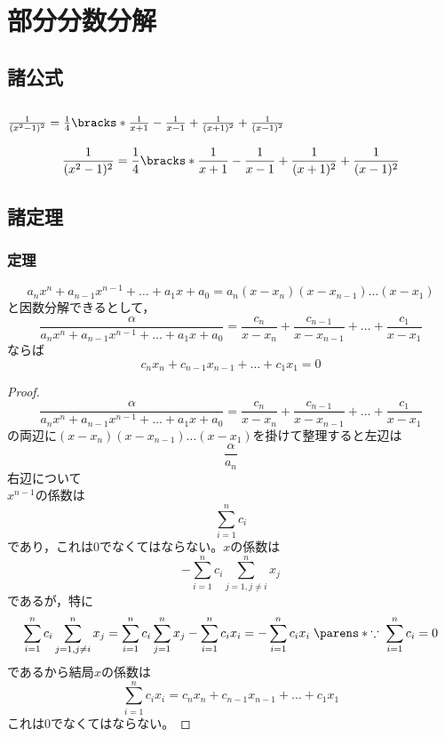 \chapter{部分分数分解}
    \section{諸公式}
        \subsection{\texorpdfstring{$\frac{1}{(x^2-1)^2} = \frac{1}{4}\bracks*{\frac{1}{x+1}-\frac{1}{x-1}+\frac{1}{(x+1)^2}+\frac{1}{(x-1)^2}}$}{1/(x\string^2-1)\string^2 = (1/4)[1/(x+1) - 1/(x-1) + 1/(x+1)\string^2 + 1/(x-1)\string^2]}}
            \label{sec:公式イ}
            \begin{shadebox}
                \[\frac{1}{(x^2-1)^2} = \frac{1}{4}\bracks*{\frac{1}{x+1}-\frac{1}{x-1}+\frac{1}{(x+1)^2}+\frac{1}{(x-1)^2}}\]
            \end{shadebox}
    \section{諸定理}
        \subsection{定理\thesubsubsection}
            \begin{shadebox}
                \[a_nx^n+a_{n-1}x^{n-1}+\dots+a_1x+a_0 = a_n(x-x_n)(x-x_{n-1})\dots(x-x_1)\]
                と因数分解できるとして，
                \[\frac{\alpha}{a_nx^n+a_{n-1}x^{n-1}+\dots+a_1x+a_0} = \frac{c_n}{x-x_n}+\frac{c_{n-1}}{x-x_{n-1}}+\dots+\frac{c_1}{x-x_1}\]ならば
                \[c_nx_n+c_{n-1}x_{n-1}+\dots+c_1x_1 = 0\]
            \end{shadebox}
            \begin{proof}
                \[\frac{\alpha}{a_nx^n+a_{n-1}x^{n-1}+\dots+a_1x+a_0} = \frac{c_n}{x-x_n}+\frac{c_{n-1}}{x-x_{n-1}}+\dots+\frac{c_1}{x-x_1}\]
                の両辺に$(x-x_n)(x-x_{n-1})\dots(x-x_1)$を掛けて整理すると左辺は
                \[\frac{\alpha}{a_n}\]
                右辺について\\
                $x^{n-1}$の係数は
                \[\sum_{i=1}^{n}c_i\]
                であり，これは0でなくてはならない。$x$の係数は
                \[-\sum_{i=1}^{n}c_i\sum_{j=1,j\neq i}^{n}x_j\]であるが，特に
                \[\sum_{i=1}^{n}c_i\sum_{j=1,j\neq i}^{n}x_j = \sum_{i=1}^{n}c_i\sum_{j=1}^{n}x_j - \sum_{i=1}^{n}c_ix_i = -\sum_{i=1}^{n}c_ix_i\; \parens*{\because\; \sum_{i=1}^{n}c_i = 0}\]
                であるから結局$x$の係数は
                \[\sum_{i=1}^{n}c_ix_i = c_nx_n+c_{n-1}x_{n-1}+\dots+c_1x_1\]
                これは0でなくてはならない。
            \end{proof}